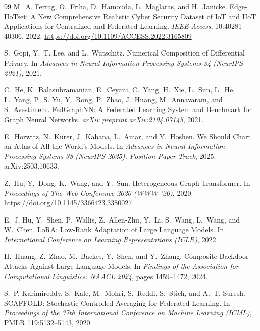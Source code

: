 \documentclass[11pt]{article}
\theoremstyle{plain}
\theoremstyle{definition}
\theoremstyle{remark}
\begin{document}
\begin{thebibliography}{99}
M.~A. Ferrag, O.~Friha, D.~Hamouda, L.~Maglaras, and H.~Janicke.
\newblock Edge-IIoTset: A New Comprehensive Realistic Cyber Security Dataset of IoT and IIoT Applications for Centralized and Federated Learning.
\newblock \emph{IEEE Access}, 10:40281--40306, 2022.
\newblock \url{https://doi.org/10.1109/ACCESS.2022.3165809}

S.~Gopi, Y.~T. Lee, and L.~Wutschitz.
\newblock Numerical Composition of Differential Privacy.
\newblock In \emph{Advances in Neural Information Processing Systems 34 (NeurIPS 2021)}, 2021.

C.~He, K.~Balasubramanian, E.~Ceyani, C.~Yang, H.~Xie, L.~Sun, L.~He, L.~Yang, P.~S. Yu, Y.~Rong, P.~Zhao, J.~Huang, M.~Annavaram, and S.~Avestimehr.
\newblock FedGraphNN: A Federated Learning System and Benchmark for Graph Neural Networks.
\newblock \emph{arXiv preprint arXiv:2104.07145}, 2021.

E.~Horwitz, N.~Kurer, J.~Kahana, L.~Amar, and Y.~Hoshen.
\newblock We Should Chart an Atlas of All the World's Models.
\newblock In \emph{Advances in Neural Information Processing Systems 38 (NeurIPS 2025), Position Paper Track}, 2025.
\newblock arXiv:2503.10633.

Z.~Hu, Y.~Dong, K.~Wang, and Y.~Sun.
\newblock Heterogeneous Graph Transformer.
\newblock In \emph{Proceedings of The Web Conference 2020 (WWW '20)}, 2020.
\newblock \url{https://doi.org/10.1145/3366423.3380027}

E.~J. Hu, Y.~Shen, P.~Wallis, Z.~Allen-Zhu, Y.~Li, S.~Wang, L.~Wang, and W.~Chen.
\newblock LoRA: Low-Rank Adaptation of Large Language Models.
\newblock In \emph{International Conference on Learning Representations (ICLR)}, 2022.

H.~Huang, Z.~Zhao, M.~Backes, Y.~Shen, and Y.~Zhang.
\newblock Composite Backdoor Attacks Against Large Language Models.
\newblock In \emph{Findings of the Association for Computational Linguistics: NAACL 2024}, pages 1459--1472, 2024.

S.~P. Karimireddy, S.~Kale, M.~Mohri, S.~Reddi, S.~Stich, and A.~T. Suresh.
\newblock SCAFFOLD: Stochastic Controlled Averaging for Federated Learning.
\newblock In \emph{Proceedings of the 37th International Conference on Machine Learning (ICML)}, PMLR 119:5132--5143, 2020.


\end{thebibliography}
\end{document}
